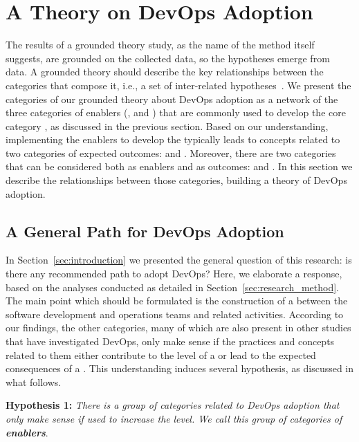 \section{A Theory on DevOps Adoption} \label{sec:results}

The results of a grounded theory study, as the name of the method itself
suggests, are grounded on the collected data, so the hypotheses emerge from
data. A grounded theory should describe the key relationships between the
categories that compose it, i.e., a set of inter-related hypotheses~\cite{hoda2017becoming}.
We present the categories of our grounded theory
about DevOps adoption as a network of the three categories of enablers (,
 and ) that are commonly used to develop the core category
\cc, as discussed in the previous section. Based on our understanding,
implementing the enablers to develop the \cc typically leads
to concepts related to two categories of expected outcomes:
 and . Moreover, there are two categories that can be considered
both as enablers and as outcomes:  and .
In this section we describe the relationships between those categories, building a theory
of DevOps adoption.

\subsection{A General Path for DevOps Adoption}

In Section~\ref{sec:introduction} we presented the general question of this
research: is there any recommended path to adopt DevOps? Here, we elaborate a response,
based on the analyses conducted as detailed in Section~\ref{sec:research_method}. The main
point which should be formulated is the construction of a  between the software development and operations teams and
related activities. According to our findings, the other categories,
many of which are also present in other studies that have investigated DevOps,
only make sense if the practices and
concepts related to them either contribute to the level of a \cc or lead to the expected consequences 
of a \cc. This understanding induces several hypothesis, as discussed in
what follows.

\begin{mh}
\textbf{Hypothesis 1:} \textit{There is a group of categories related to DevOps adoption
that only make sense if used to increase the} \cc \emph{level. We
call this group of categories of \textbf{enablers}}.
\end{mh}

